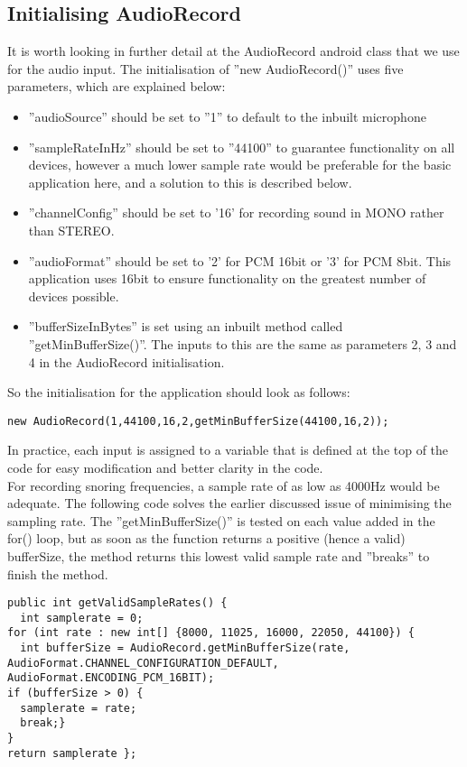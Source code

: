 \subsection{Initialising AudioRecord}
It is worth looking in further detail at the AudioRecord android class that we use for the audio input. The initialisation of ''new AudioRecord()'' uses five parameters, which are explained below:
\begin{itemize}
\item ''audioSource'' should be set to ''1'' to default to the inbuilt microphone
\item ''sampleRateInHz'' should be set to ''44100'' to guarantee functionality on all devices, however a much lower sample rate would be preferable for the basic application here, and a solution to this is described below.
\item ''channelConfig'' should be set to '16' for recording sound in MONO rather than STEREO. 
\item ''audioFormat'' should be set to '2' for PCM 16bit or '3' for PCM 8bit. This application uses 16bit to ensure functionality on the greatest number of devices possible.
\item ''bufferSizeInBytes'' is set using an inbuilt method called ''getMinBufferSize()''. The inputs to this are the same as parameters 2, 3 and 4 in the AudioRecord initialisation.
\end{itemize}
So the initialisation for the application should look as follows:
\begin{lstlisting}
new AudioRecord(1,44100,16,2,getMinBufferSize(44100,16,2));
\end{lstlisting}
In practice, each input is assigned to a variable that is defined at the top of the code for easy modification and better clarity in the code.
\\ For recording snoring frequencies, a sample rate of as low as 4000Hz would be adequate. The following code solves the earlier discussed issue of minimising the sampling rate. The ''getMinBufferSize()'' is tested on each value added in the for() loop, but as soon as the function returns a positive (hence a valid) bufferSize, the method returns this lowest valid sample rate and ''breaks'' to finish the method.
\begin{lstlisting}
public int getValidSampleRates() {
  int samplerate = 0;
for (int rate : new int[] {8000, 11025, 16000, 22050, 44100}) {
  int bufferSize = AudioRecord.getMinBufferSize(rate, AudioFormat.CHANNEL_CONFIGURATION_DEFAULT, AudioFormat.ENCODING_PCM_16BIT);
if (bufferSize > 0) {
  samplerate = rate;
  break;}
}
return samplerate };
\end{lstlisting}
